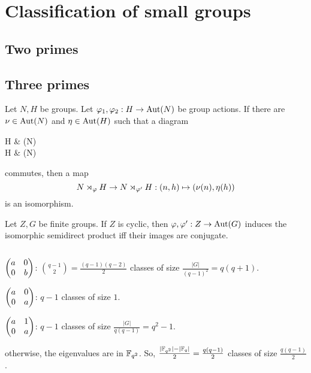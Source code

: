 \documentclass{../note}
\begin{document}
\chapter{Classification of small groups}


\section{Two primes}
\begin{ex}[$|G|=p^2$]
\end{ex}

\begin{ex}[$|G|=pq$]
\end{ex}




\section{Three primes}
\begin{lem}
Let $N,H$ be groups.
Let $\varphi_1,\varphi_2:H\to\operatorname{Aut}(N)$ be group actions.
If there are $\nu\in\operatorname{Aut}(N)$ and $\eta\in\operatorname{Aut}(H)$ such that a diagram
\begin{cd}
H  & \Aut(N) \\
H  & \Aut(N)
\end{cd}
commutes, then a map
\[N\rtimes_\varphi H\to N\rtimes_{\varphi'}H:(n,h)\mapsto(\nu(n),\eta(h))\]
is an isomorphism.
\end{lem}
\begin{lem}
Let $Z,G$ be finite groups.
If $Z$ is cyclic, then $\varphi,\varphi':Z\to\operatorname{Aut}(G)$ induces the isomorphic semidirect product iff their images are conjugate.
\end{lem}

\begin{ex}
$ $
\begin{parts}
\item $\begin{pmatrix}a&0\\0&b\end{pmatrix}$: $\binom{q-1}2=\frac{(q-1)(q-2)}2$ classes of size $\frac{|G|}{(q-1)^2}=q(q+1)$.
\item $\begin{pmatrix}a&0\\0&a\end{pmatrix}$: $q-1$ classes of size $1$.
\item $\begin{pmatrix}a&1\\0&a\end{pmatrix}$: $q-1$ classes of size $\frac{|G|}{q(q-1)}=q^2-1$.
\item otherwise, the eigenvalues are in $\mathbb{F}_{q^2}$. So, $\frac{|\mathbb{F}_{q^2}|-|\mathbb{F}_q|}2=\frac{q(q-1)}2$ classes of size $\frac{q(q-1)}2$.
\end{parts}
\end{ex}
\end{document}
